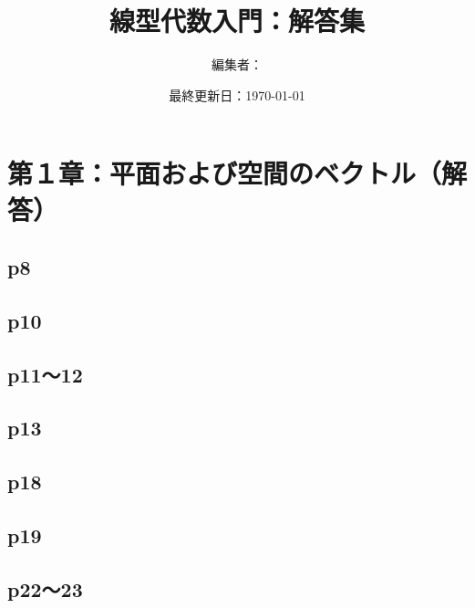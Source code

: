 \documentclass[dvipdfmx,uplatex,11pt]{jsarticle}
\title{線型代数入門：解答集}
\author{編集者：}
\date{最終更新日：\today}
\begin{document}
\maketitle
\tableofcontents
\newpage
%
%
%
\section{第１章：平面および空間のベクトル（解答）}
\subsection{p8}
%
%
%
\newpage
%
%
%
\subsection{p10}
%
%
%
\newpage
%
%
%
\subsection{p11〜12}
%
%
%
\newpage
%
%
%
\subsection{p13}
%
%
%
\newpage
%
%
%
\subsection{p18}
%
%
%
\newpage
%
%
%
\subsection{p19}
%
%
%
\newpage
%
%
%
\subsection{p22〜23}
%
%
%
\newpage
%
%
%
\setcounter{equation}{0}
\end{document}

